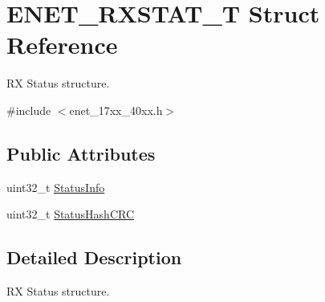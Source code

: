 \hypertarget{struct_e_n_e_t___r_x_s_t_a_t___t}{\section{E\+N\+E\+T\+\_\+\+R\+X\+S\+T\+A\+T\+\_\+\+T Struct Reference}
\label{struct_e_n_e_t___r_x_s_t_a_t___t}
}


R\+X Status structure.  




{\ttfamily \#include $<$enet\+\_\+17xx\+\_\+40xx.\+h$>$}

\subsection*{Public Attributes}
\begin{DoxyCompactItemize}
\item 
uint32\+\_\+t \hyperlink{struct_e_n_e_t___r_x_s_t_a_t___t_a0d2de29791ff4358c5cc4dedd694857d}{Status\+Info}
\item 
uint32\+\_\+t \hyperlink{struct_e_n_e_t___r_x_s_t_a_t___t_a52d71f70dc193d59f6cb67241d92a4c9}{Status\+Hash\+C\+R\+C}
\end{DoxyCompactItemize}


\subsection{Detailed Description}
R\+X Status structure. 

